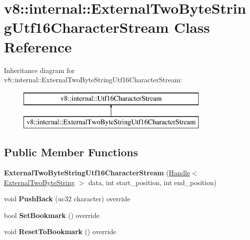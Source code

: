 \hypertarget{classv8_1_1internal_1_1_external_two_byte_string_utf16_character_stream}{}\section{v8\+:\+:internal\+:\+:External\+Two\+Byte\+String\+Utf16\+Character\+Stream Class Reference}
\label{classv8_1_1internal_1_1_external_two_byte_string_utf16_character_stream}
Inheritance diagram for v8\+:\+:internal\+:\+:External\+Two\+Byte\+String\+Utf16\+Character\+Stream\+:\begin{figure}[H]
\begin{center}
\leavevmode
\includegraphics[height=2.000000cm]{classv8_1_1internal_1_1_external_two_byte_string_utf16_character_stream}
\end{center}
\end{figure}
\subsection*{Public Member Functions}
\begin{DoxyCompactItemize}
\item 
{\bfseries External\+Two\+Byte\+String\+Utf16\+Character\+Stream} (\hyperlink{classv8_1_1internal_1_1_handle}{Handle}$<$ \hyperlink{classv8_1_1internal_1_1_external_two_byte_string}{External\+Two\+Byte\+String} $>$ data, int start\+\_\+position, int end\+\_\+position)\hypertarget{classv8_1_1internal_1_1_external_two_byte_string_utf16_character_stream_a610de706475becc6bacd2f40bf2a08c9}{}\label{classv8_1_1internal_1_1_external_two_byte_string_utf16_character_stream_a610de706475becc6bacd2f40bf2a08c9}

\item 
void {\bfseries Push\+Back} (uc32 character) override\hypertarget{classv8_1_1internal_1_1_external_two_byte_string_utf16_character_stream_a2b8c2e3e1ef0c87b0dc470608931fef9}{}\label{classv8_1_1internal_1_1_external_two_byte_string_utf16_character_stream_a2b8c2e3e1ef0c87b0dc470608931fef9}

\item 
bool {\bfseries Set\+Bookmark} () override\hypertarget{classv8_1_1internal_1_1_external_two_byte_string_utf16_character_stream_aea5e2226251ad82bf361511d0a5f01cf}{}\label{classv8_1_1internal_1_1_external_two_byte_string_utf16_character_stream_aea5e2226251ad82bf361511d0a5f01cf}

\item 
void {\bfseries Reset\+To\+Bookmark} () override\hypertarget{classv8_1_1internal_1_1_external_two_byte_string_utf16_character_stream_a7873567ae9923815ec5a21af1ab0a910}{}\label{classv8_1_1internal_1_1_external_two_byte_string_utf16_character_stream_a7873567ae9923815ec5a21af1ab0a910}

\end{DoxyCompactItemize}
